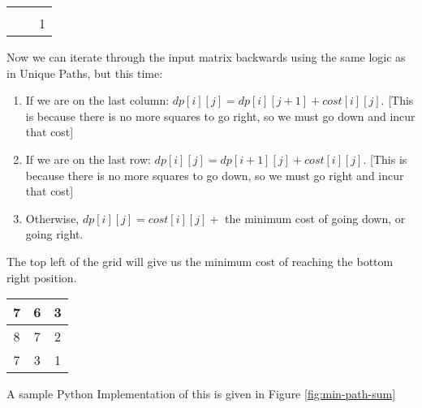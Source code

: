 \begin{table}[H]
    \centering
    \begin{tabular}{|c|c|c|}
        \hline
         &  &  \\
        \hline
         &  &  \\
        \hline
         &  & 1 \\
        \hline
    \end{tabular}
\end{table}
Now we can iterate through the input matrix backwards using the same logic as in Unique Paths, but this time:


\begin{enumerate}
    \item If we are on the last column: $dp[i][j] = dp[i][j+1] + cost[i][j]$.
    [This is because there is no more squares to go right, so we must go down and incur that cost]

    \item If we are on the last row: $dp[i][j] = dp[i+1][j] + cost[i][j]$.
    [This is because there is no more squares to go down, so we must go right and incur that cost]

    \item Otherwise, $dp[i][j] = cost[i][j] +$ the minimum cost of going down, or going right.

\end{enumerate}

The top left of the grid will give us the minimum cost of reaching the bottom right position.

\begin{table}[H]
    \centering
    \begin{tabular}{|c|c|c|}
        \hline
        7 & 6 & 3 \\
        \hline
        8 & 7 & 2 \\
        \hline
        7 & 3 & 1 \\
        \hline
    \end{tabular}
\end{table}

A sample Python Implementation of this is given in Figure \ref{fig:min-path-sum}


